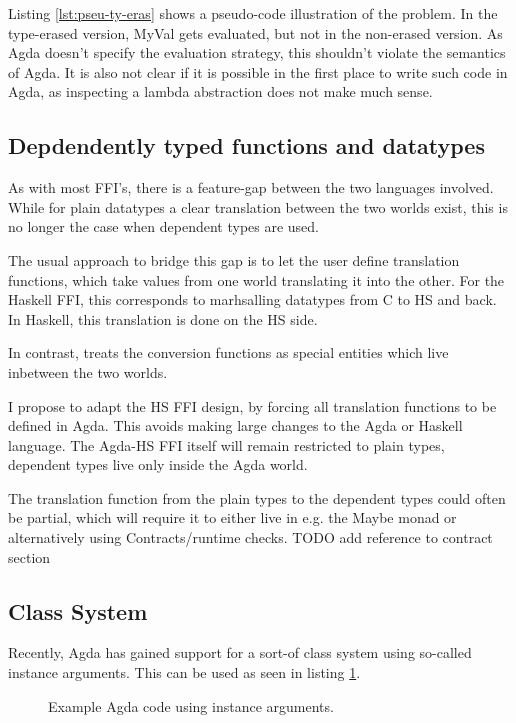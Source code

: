 \documentclass[12pt, a4paper, twoside]{report}
\begin{document}
Listing \ref{lst:pseu-ty-eras} shows a pseudo-code illustration of the problem.
In the type-erased version, MyVal gets evaluated, but not in the non-erased version. As Agda doesn't specify the
evaluation strategy, this shouldn't violate the semantics of Agda. It is also not clear if
it is possible in the first place to write such code in Agda, as inspecting a lambda abstraction
does not make much sense.

\subsection{Depdendently typed functions and datatypes}
As with most FFI's, there is a feature-gap between the two languages involved. While for plain datatypes a clear
translation between the two worlds exist, this is no longer the case when dependent types are used.

The usual approach to bridge this gap is to let the user define translation functions, which take
values from one world translating it into the other. For the Haskell FFI, this corresponds to marhsalling
datatypes from C to HS and back. In Haskell, this translation is done on the HS side.

In contrast, \cite{Osera:2012:DI:2103776.2103779} treats the conversion functions as special entities
which live inbetween the two worlds.


I propose to adapt the HS FFI design, by forcing all translation functions to be defined in Agda.
This avoids making large changes to the Agda or Haskell language. The Agda-HS FFI itself will remain
restricted to plain types, dependent types live only inside the Agda world.

The translation function from the plain types to the dependent types could often be partial,
which will require it to either live in e.g. the Maybe monad or alternatively using Contracts/runtime checks.
TODO add reference to contract section

\subsection{Class System}
Recently, Agda has gained support for a sort-of class system using so-called instance arguments. This can
be used as seen in listing \ref{lst:agda-inst-ex}.
\begin{figure}

\caption{Example Agda code using instance arguments.}
\label{lst:agda-inst-ex}
\end{figure}
\end{document}
